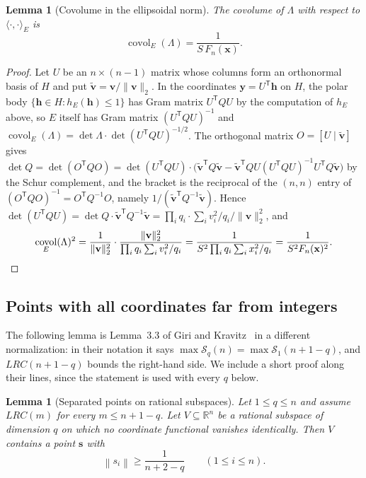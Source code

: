 \documentclass[11pt]{article}
\newtheorem{lemma}[theorem]{Lemma}
\theoremstyle{definition}
\theoremstyle{remark}
\newcommand{\R}{\mathbb{R}}
\newcommand{\vct}[1]{\mathbf{#1}}
\newcommand{\nearest}[1]{\left\lVert #1\right\rVert}
\DeclareMathOperator{\covol}{covol}
\begin{document}
\begin{lemma}[Covolume in the ellipsoidal norm]\label{lem:det}
The covolume of $\Lambda$ with respect to $\langle\cdot,\cdot\rangle_E$ is
\[
  \covol_E(\Lambda)=\frac{1}{S\,F_n(\vct{x})}.
\]
\end{lemma}

\begin{proof}
Let $U$ be an $n\times(n-1)$ matrix whose columns form an orthonormal
basis of $H$ and put $\tilde{\vct{v}}=\vct{v}/\lVert\vct{v}\rVert_2$.  In
the coordinates $\vct{y}=U^{\mathsf T}\vct{h}$ on $H$, the polar body
$\{\vct{h}\in H:h_E(\vct{h})\leq1\}$ has Gram matrix $U^{\mathsf T}QU$ by
the computation of $h_E$ above, so $E$ itself has Gram matrix
$(U^{\mathsf T}QU)^{-1}$ and
$\covol_E(\Lambda)=\det\Lambda\cdot\det(U^{\mathsf T}QU)^{-1/2}$.  The
orthogonal matrix $O=[U\mid\tilde{\vct{v}}]$ gives
$\det Q=\det(O^{\mathsf T}QO)
 =\det(U^{\mathsf T}QU)\cdot\bigl(\tilde{\vct{v}}^{\mathsf T}Q\tilde{\vct{v}}
 -\tilde{\vct{v}}^{\mathsf T}QU(U^{\mathsf T}QU)^{-1}U^{\mathsf T}Q\tilde{\vct{v}}\bigr)$
by the Schur complement, and the bracket is the reciprocal of the
$(n,n)$ entry of $(O^{\mathsf T}QO)^{-1}=O^{\mathsf T}Q^{-1}O$, namely
$1/(\tilde{\vct{v}}^{\mathsf T}Q^{-1}\tilde{\vct{v}})$.  Hence
$\det(U^{\mathsf T}QU)=\det Q\cdot\tilde{\vct{v}}^{\mathsf T}Q^{-1}\tilde{\vct{v}}
=\prod_iq_i\cdot\sum_iv_i^2/q_i\big/\lVert\vct{v}\rVert_2^2$, and
\[
  \covol_E(\Lambda)^2
  =\frac{1}{\lVert\vct{v}\rVert_2^2}\cdot
   \frac{\lVert\vct{v}\rVert_2^2}{\prod_iq_i\sum_iv_i^2/q_i}
  =\frac{1}{S^2\prod_iq_i\sum_ix_i^2/q_i}
  =\frac{1}{S^2F_n(\vct{x})^2}.\qedhere
\]
\end{proof}

\subsection{Points with all coordinates far from integers}

The following lemma is Lemma~3.3 of Giri and Kravitz~\cite{GK26} in a
different normalization: in their notation it says
$\max\mathcal S_q(n)=\max\mathcal S_1(n+1-q)$, and $LRC(n+1-q)$ bounds
the right-hand side.  We include a short proof along their lines, since
the statement is used with every $q$ below.

\begin{lemma}[Separated points on rational subspaces]\label{lem:safe}
Let $1\leq q\leq n$ and assume $LRC(m)$ for every $m\leq n+1-q$.  Let
$V\subseteq\R^n$ be a rational subspace of dimension $q$ on which no
coordinate functional vanishes identically.  Then $V$ contains a point
$\vct{s}$ with
\[
  \nearest{s_i}\geq\frac{1}{n+2-q}\qquad(1\leq i\leq n).
\]
\end{lemma}
\end{document}
